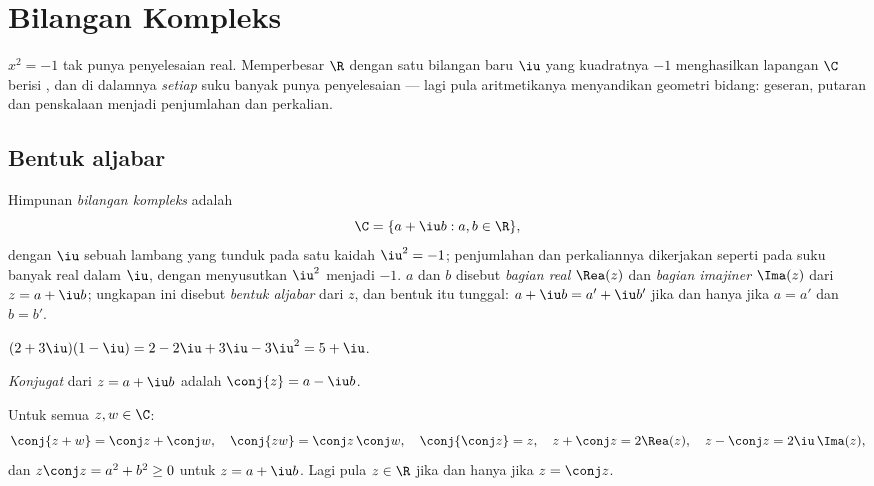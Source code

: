 \chapter{Bilangan Kompleks}\label{ch:g12:complex}

 $x^2 = -1$ tak punya penyelesaian real. Memperbesar $\R$ dengan satu
bilangan baru $\iu$ yang kuadratnya $-1$ menghasilkan lapangan $\C$ berisi , dan di dalamnya \emph{setiap}  suku banyak punya penyelesaian ---
lagi pula aritmetikanya menyandikan geometri bidang: geseran, putaran
dan penskalaan menjadi penjumlahan dan perkalian.

\section{Bentuk aljabar}

\begin{definition}\label{def:g12:complex:def}
Himpunan \emph{bilangan kompleks} adalah
\[
\C = \{a + \iu b : a, b \in \R\},
\]
dengan $\iu$ sebuah lambang yang tunduk pada satu kaidah $\iu^2 = -1$; penjumlahan
dan perkaliannya dikerjakan seperti pada suku banyak real dalam $\iu$, dengan
menyusutkan $\iu^2$ menjadi $-1$.  $a$ dan $b$ disebut \emph{bagian
real} $\Rea(z)$ dan \emph{bagian imajiner}
$\Ima(z)$ dari $z = a + \iu b$; ungkapan ini disebut \emph{bentuk
aljabar} dari $z$, dan bentuk itu tunggal:
$a + \iu b = a' + \iu b'$ jika dan hanya jika $a = a'$ dan $b = b'$.
\end{definition}

\begin{example}
$(2 + 3\iu)(1 - \iu) = 2 - 2\iu + 3\iu - 3\iu^2 = 5 + \iu$.
\end{example}

\begin{definition}[Konjugat]\label{def:g12:complex:conjugate}
\emph{Konjugat} dari $z = a + \iu b$ adalah
$\conj{z} = a - \iu b$.
\end{definition}

\begin{proposition}\label{prop:g12:complex:conjugate}
Untuk semua $z, w \in \C$:
\[
\conj{z + w} = \conj z + \conj w, \quad
\conj{zw} = \conj z\,\conj w, \quad
\conj{\conj z} = z, \quad
z + \conj z = 2\Rea(z), \quad
z - \conj z = 2\iu\,\Ima(z),
\]
dan $z\conj z = a^2 + b^2 \geq 0$ untuk $z = a + \iu b$. Lagi pula $z \in \R$
jika dan hanya jika $z = \conj z$.
\end{proposition}

